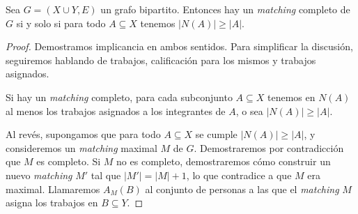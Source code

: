   \begin{theorem}[Hall]
    \label{theo:Hall}
    Sea \(G = (X \cup Y, E)\) un grafo bipartito.
    Entonces
    hay
    un \emph{\foreignlanguage{english}{matching}} completo de \(G\)
    si y solo si para todo \(A \subseteq X\)
    tenemos \(\lvert N(A) \rvert \ge \lvert A \rvert\).
  \end{theorem}
  \begin{proof}
    Demostramos implicancia en ambos sentidos.
    Para simplificar la discusión,
    seguiremos hablando de trabajos,
    calificación para los mismos y trabajos asignados.

    Si hay un \emph{\foreignlanguage{english}{matching}} completo,
    para cada subconjunto \(A \subseteq X\)
    tenemos en \(N(A)\)
    al menos los trabajos asignados a los integrantes de \(A\),
    o sea \(\lvert N(A) \rvert \ge \lvert A \rvert\).

    Al revés,
    supongamos que para todo \(A \subseteq X\)
    se cumple \(\lvert N(A) \rvert \ge \lvert A \rvert\),
    y consideremos
    un \emph{\foreignlanguage{english}{matching}} maximal \(M\)
    de \(G\).
    Demostraremos por contradicción que \(M\) es completo.
    Si \(M\) no es completo,
    demostraremos cómo construir
    un nuevo \emph{\foreignlanguage{english}{matching}} \(M'\)
    tal que \(\lvert M' \rvert = \lvert M \rvert + 1\),
    lo que contradice a que \(M\) era maximal.
    Llamaremos \(A_M(B)\) al conjunto de personas
    a las que el \emph{\foreignlanguage{english}{matching}} \(M\)
    asigna los trabajos en \(B \subseteq Y\).


\end{proof}

